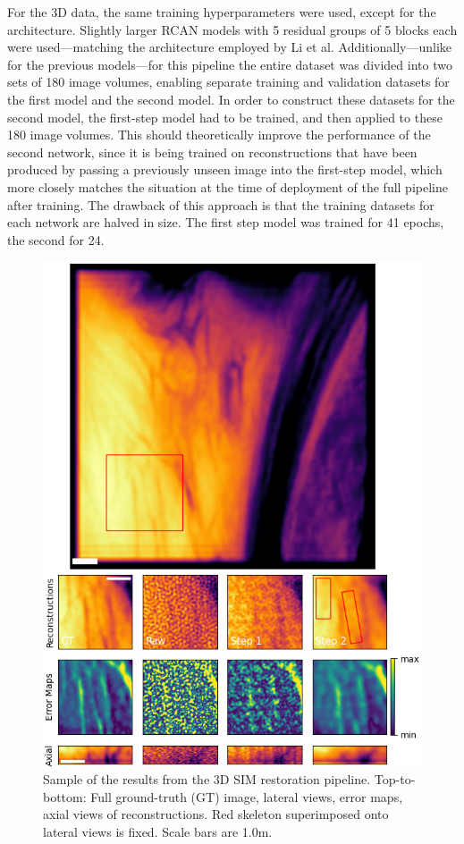 \documentclass[12pt]{article}
\begin{document}
For the 3D data, the same training hyperparameters were used, except for the architecture.
Slightly larger RCAN models with 5 residual groups of 5 blocks each were used---matching the architecture employed by Li et al.
Additionally---unlike for the previous models---for this pipeline the entire dataset was divided into two sets of 180 image volumes,
enabling separate training and validation datasets for the first model and the second model.
In order to construct these datasets for the second model, the first-step model had to be trained,
and then applied to these 180 image volumes.
This should theoretically improve the performance of the second network,
since it is being trained on reconstructions that have been produced by passing a previously unseen image into the first-step model,
which more closely matches the situation at the time of deployment of the full pipeline after training.
The drawback of this approach is that the training datasets for each network are halved in size.
The first step model was trained for 41 epochs, the second for 24.

\begin{figure}[hbtp]
    \includegraphics[scale=1.05, center]{figures/vh_error.png}
    \caption{Sample of the results from the 3D SIM restoration pipeline.
    Top-to-bottom: Full ground-truth (GT) image, lateral views, error maps, axial views of reconstructions.
    Red skeleton superimposed onto lateral views is fixed. Scale bars are 1.0\textmu m.}
    \label{fig:vh_samples_error}
\end{figure}
\end{document}
